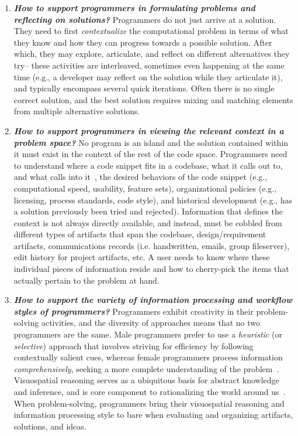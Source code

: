 \documentclass{ppig}
\begin{document}
\begin{enumerate}
	\item \textit{\textbf{How to support programmers in formulating problems and reflecting on solutions?}}
	Programmers do not just arrive at a solution.
	They need to first \textit{contextualize} the computational problem in terms of what they know and how they can progress towards a possible solution.
	After which, they may explore, articulate, and reflect on different alternatives they try-- these activities are interleaved, sometimes even happening at the same time (e.g., a developer may reflect on the solution while they articulate it), and typically encompass several quick iterations.
	Often there is no single correct solution, and the best solution requires mixing and matching elements from multiple alternative solutions.
    
    \item \textit{\textbf{How to support programmers in viewing the relevant context in a problem space?}}
    No program is an island and the solution contained within it must exist in the context of the rest of the code space.
    Programmers need to understand where a code snippet fits in a codebase, what it calls out to, and what calls into it~\cite{desouza2008empirical}, the desired behaviors of the code snippet (e.g., computational speed, usability, feature sets), organizational policies (e.g., licensing, process standards, code style), and historical development (e.g., has a solution previously been tried and rejected).
    Information that defines the context is not always directly available, and instead, must be cobbled from different types of artifacts that span the codebase, design/requirement artifacts, communications records (i.e. handwritten, emails, group fileserver), edit history for project artifacts, etc.
    A user needs to know where these individual pieces of information reside and how to cherry-pick the items that actually pertain to the problem at hand.
    
 	\item \textit{\textbf{How to support the variety of information processing and workflow styles of programmers?}}
 	Programmers exhibit creativity in their problem-solving activities, and the diversity of approaches means that no two programmers are the same.
 	Male programmers prefer to use a \textit{heuristic} (or \textit{selective}) approach that involves striving for efficiency by following contextually salient cues, whereas female programmers process information \textit{comprehensively}, seeking a more complete understanding of the problem~\cite{grigoreanu2012end}.
 	Visuospatial reasoning serves as a ubiquitous basis for abstract knowledge and inference, and is core component to rationalizing the world around us~\cite{tversky2005visuospatial}.
 	When problem-solving, programmers bring their visuospatial reasoning and information processing style to bare when evaluating and organizing artifacts, solutions, and ideas.
  

\end{enumerate}
\end{document}
